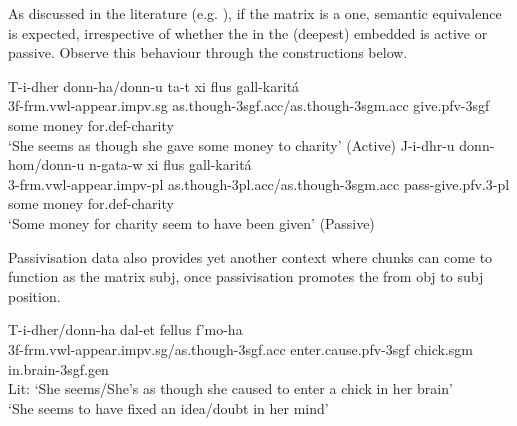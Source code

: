 \documentclass[output=paper]{LSP/langsci}
\begin{document}
As discussed in the literature (e.g. ), if the matrix  is a  one, semantic equivalence is expected, irrespective of whether the  in the (deepest) embedded  is active or passive. Observe this behaviour through the constructions below. 


\ea
\ea
\gll T-i-dher donn-ha/donn-u ta-t xi flus g\textcrh all-karit{\'a}\\
3{\sc f}-{\sc frm.vwl}-appear.{\sc impv.sg} as.though-{\sc 3sgf.acc}/as.though-{\sc 3sgm.acc} give.{\sc pfv-3sgf} some money for.{\sc def-}charity\\
\glt `She seems as though she gave some money to charity' \hfill{(Active)}
\ex
\gll J-i-dhr-u donn-hom/donn-u n-g\textcrh ata-w xi flus g\textcrh all-karit{\'a}\\
3-{\sc frm.vwl}-appear.{\sc impv-pl} as.though-{\sc 3pl.acc}/as.though-{\sc 3sgm.acc} {\sc pass}-give.{\sc pfv.3-pl} some money for.{\sc def-}charity\\
\glt `Some money for charity seem to have been given' \hfill{(Passive)}
\z
\z

Passivisation data also provides  yet another context where  chunks can come to function as the matrix {\sc subj}, once passivisation promotes the  from {\sc obj} to {\sc subj} position. 

\ea \label{pfvraising} 
\ea
\gll T-i-dher/donn-ha da\textcrh \textcrh l-et fellus f'mo\textcrh\textcrh-ha\\
3{\sc f}-{\sc frm.vwl}-appear.{\sc impv.sg}/as.though-{\sc 3sgf.acc} enter.{\sc cause.pfv-3sgf} chick.{\sc sgm} in.brain-{\sc 3sgf.gen}\\
\glt Lit: `She seems/She's as though she caused to enter a chick in her brain'\\
\glt `She seems to have fixed an idea/doubt in her mind' 
\end{document}
